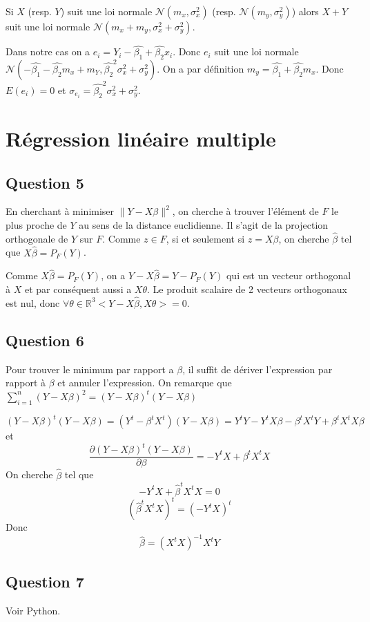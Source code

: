 \documentclass[pdflatex]{article}
\theoremstyle{definition}
\newcommand{\bb}[1]{\mathbb{#1}}
\newcommand{\R}{\bb{R}}
\begin{document}
Si $X$ (resp. $Y$) suit une loi normale $\mathscr{N}(m_x, \sigma_x^2)$ (resp. $\mathscr{N}(m_y, \sigma_y^2)$) alors $X+Y$ suit une loi normale $\mathscr{N}(m_x + m_y, \sigma_x^2+\sigma_y^2)$.

Dans notre cas on a $e_i = Y_i - \hat{\beta_1} + \hat{\beta_2}x_i$. Donc $e_i$ suit une loi normale  
$\mathscr{N}(- \hat{\beta_1} - \hat{\beta_2}m_x + m_Y, \hat{\beta_2}^2\sigma_x^2+\sigma_y^2)$. On a par d\'efinition $m_y = \hat{\beta_1} + \hat{\beta_2}m_x$. Donc $E(e_i) = 0$ et $\sigma_{e_i} = \hat{\beta_2}^2\sigma_x^2+\sigma_y^2$.

\section*{R\'egression lin\'eaire multiple}
\subsection*{Question 5}
En cherchant \`a minimiser $\lVert Y - X\beta \rVert^2$, on cherche \`a trouver l'\'el\'ement de $F$ le plus proche de $Y$ au sens de la distance euclidienne. Il s'agit de la projection orthogonale de $Y$ sur $F$. Comme $z \in F$, si et seulement si $z = X\beta$, on cherche $\hat{\beta}$ tel que $X\hat{\beta} = P_F(Y)$. 

Comme $X\hat{\beta} = P_F(Y)$, on a $Y - X\hat{\beta} = Y - P_F(Y)$ qui est un vecteur orthogonal \`a $X$ et par cons\'equent aussi a $X\theta$. Le produit scalaire de 2 vecteurs orthogonaux est nul, donc $\forall \theta \in \R^{3} <Y - X\hat{\beta}, X\theta> = 0$.

\subsection*{Question 6}
Pour trouver le minimum par rapport a $\beta$, il suffit de d\'eriver l'expression par rapport \`a $\beta$ et annuler l'expression. On remarque que $\sum_{i=1}^{n}{(Y-X\beta)^2} = (Y-X\beta)^t(Y-X\beta)$

$$
(Y-X\beta)^t(Y-X\beta) = (Y^t-\beta^tX^t)(Y-X\beta) = Y^tY-Y^tX\beta - \beta^tX^tY + \beta^tX^tX\beta
$$
et
$$
\frac{\partial (Y-X\beta)^t(Y-X\beta) }{\partial \beta} = -Y^tX + \beta^tX^tX
$$
On cherche $\hat{\beta}$ tel que
$$
-Y^tX + \hat{\beta}^tX^tX = 0
$$
$$
(\hat{\beta}^tX^tX)^t = (-Y^tX)^t
$$
Donc
$$
\hat{\beta} = (X^tX)^{-1}X^tY
$$

\subsection*{Question 7}
Voir Python.
\end{document}
